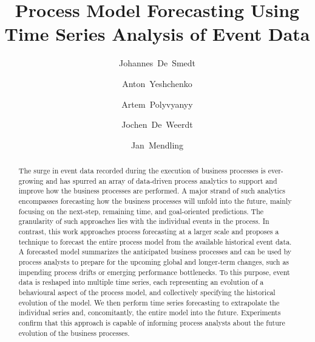 \documentclass{svproc}
\begin{document}
\mainmatter
%
\title{Process Model Forecasting Using Time Series Analysis of Event Data}
%
%
\author{Johannes~De~Smedt \and Anton~Yeshchenko \and Artem~Polyvyanyy \and Jochen~De~Weerdt \and Jan~Mendling}
%
\maketitle

\begin{abstract}
The surge in event data recorded during the execution of business processes is ever-growing and has spurred an array of data-driven process analytics to support and improve how the business processes are performed.
A major strand of such analytics encompasses forecasting how the business processes will unfold into the future, mainly focusing on the next-step, remaining time, and goal-oriented predictions.
The granularity of such approaches lies with the individual events in the process.
In contrast, this work approaches process forecasting at a larger scale and proposes a technique to forecast the entire process model from the available historical event data.
A forecasted model summarizes the anticipated business processes and can be used by process analysts to prepare for the upcoming global and longer-term changes, such as impending process drifts or emerging performance bottlenecks.
To this purpose, event data is reshaped into multiple time series, each representing an evolution of a behavioural aspect of the process model, and collectively specifying the historical evolution of the model.
We then perform time series forecasting to extrapolate the individual series and, concomitantly, the entire model into the future.
Experiments confirm that this approach is capable of informing process analysts about the future evolution of the business processes.
\end{abstract}
%




%
\end{document}
